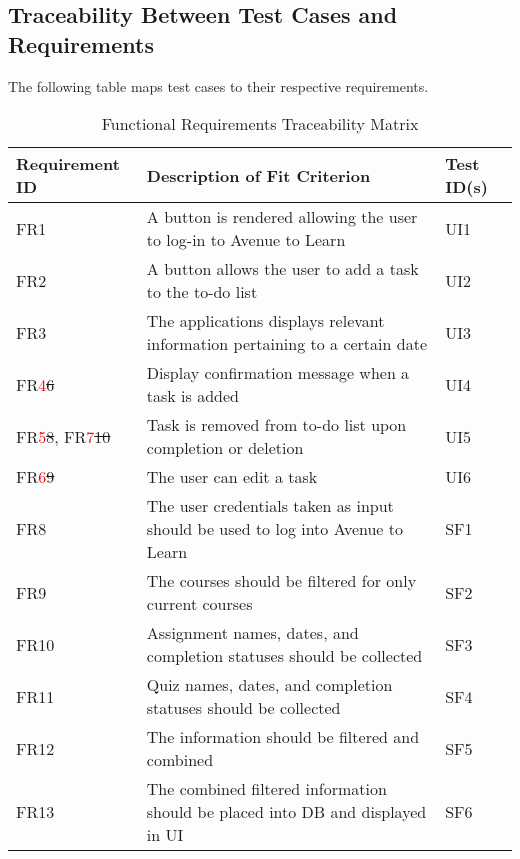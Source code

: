 \documentclass[12pt, titlepage]{article}
\begin{document}
\subsection{Traceability Between Test Cases and Requirements}

The following table maps test cases to their respective requirements.

\begin{table}[H]
\caption{Functional Requirements Traceability Matrix}
\begin{center}
\begin{tabular}{ |m{7em}|m{20em}|m{6em}|} 
 \hline
 Requirement ID & Description of Fit Criterion & Test ID(s) \\ 
 \hline
 FR1 & A button is rendered allowing the user to log-in to Avenue to Learn & UI1 \\
 \hline
 FR2 & A button allows the user to add a task to the to-do list & UI2\\ 
 \hline
 FR3 & The applications displays relevant information pertaining to a certain date & UI3\\
 \hline 
 FR\textcolor{red}{4}\sout{6} & Display confirmation message when a task is added & UI4\\
 \hline
 FR\textcolor{red}{5}\sout{8}, FR\textcolor{red}{7}\sout{10} & Task is removed from to-do list upon completion or deletion & UI5\\
 \hline
 FR\textcolor{red}{6}\sout{9} & The user can edit a task & UI6\\
 \hline
 \color{red} FR8 & \color{red} The user credentials taken as input should be used to log into Avenue to Learn & \color{red} SF1\\
 \hline
  \color{red} FR9 & \color{red} The courses should be filtered for only current courses & \color{red} SF2\\
 \hline
  \color{red} FR10 & \color{red} Assignment names, dates, and completion statuses should be collected & \color{red} SF3\\
 \hline
  \color{red} FR11 & \color{red} Quiz names, dates, and completion statuses should be collected & \color{red} SF4\\
 \hline
  \color{red} FR12 & \color{red} The information should be filtered and combined & \color{red} SF5\\
 \hline
  \color{red} FR13 & \color{red} The combined filtered information should be placed into DB and displayed in UI & \color{red} SF6\\
 \hline
\end{tabular}
\end{center}
\label{traceabilityFunc}
\end{table}
\end{document}
